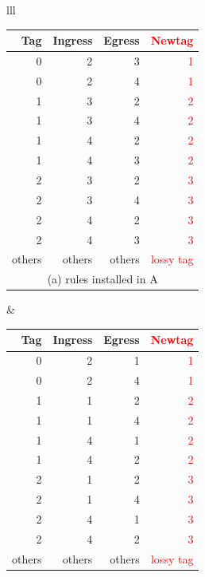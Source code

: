 \begin{table}[t]
    \footnotesize
	\centering
	\begin{tabular}{lll}
		\begin{tabular}{|r|r|r|r|}
			\hline
			Tag&  Ingress& Egress & \textcolor{red}{Newtag} \\
			\hline
			\hline
			0 & 2 & 3 & \textcolor{red}{1} \\
			\hline
			0 & 2 & 4 & \textcolor{red}{1} \\
			\hline
			1 & 3 & 2 & \textcolor{red}{2} \\
			\hline
			1 & 3 & 4 & \textcolor{red}{2} \\
			\hline
			1 & 4 & 2 & \textcolor{red}{2} \\
			\hline
			1 & 4 & 3 & \textcolor{red}{2} \\
			\hline
			2 & 3 & 2& \textcolor{red}{3} \\
			\hline
			2 & 3 & 4 & \textcolor{red}{3} \\
			\hline
			2 & 4 & 2 & \textcolor{red}{3} \\
			\hline
			2 & 4 & 3 & \textcolor{red}{3} \\
			\hline
			others & others & others & \textcolor{red}{lossy tag} \\
			\hline
			\multicolumn{4}{c}{(a) rules installed in A} \\
		\end{tabular}
		&
		\begin{tabular}{|r|r|r|r|}
			\hline
			Tag&  Ingress& Egress & \textcolor{red}{Newtag} \\
			\hline
			\hline
			0 & 2 & 1 & \textcolor{red}{1} \\
			\hline
			0 & 2 & 4 & \textcolor{red}{1} \\
			\hline
			1 & 1 & 2 & \textcolor{red}{2} \\
			\hline
			1 & 1 & 4 & \textcolor{red}{2} \\
			\hline
			1 & 4 & 1 & \textcolor{red}{2} \\
			\hline
			1 & 4 & 2 & \textcolor{red}{2} \\
			\hline
			2 & 1 & 2& \textcolor{red}{3} \\
			\hline
			2 & 1 & 4 & \textcolor{red}{3} \\
			\hline
			2 & 4 & 1 & \textcolor{red}{3} \\
			\hline
			2 & 4 & 2 & \textcolor{red}{3} \\
			\hline
			others & others & others & \textcolor{red}{lossy tag} \\

\end{tabular}
\end{tabular}
\end{table}
